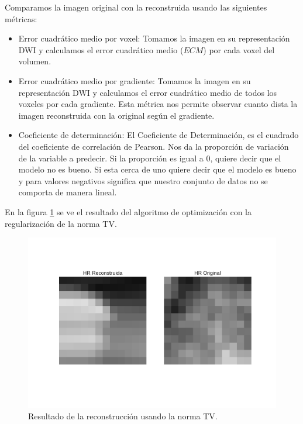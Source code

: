 \documentclass[a4paper,10pt]{article}%
\begin{document}
Comparamos la imagen original con la reconstruida usando las siguientes 
métricas:

\begin{itemize}
 \item Error cuadrático medio por voxel: Tomamos la imagen en su 
representación DWI y calculamos el error cuadrático medio ($ECM$) por cada voxel del 
volumen.
 \item Error cuadrático medio por gradiente: Tomamos la imagen en su 
representación DWI y calculamos el error cuadrático medio de todos los voxeles 
por cada gradiente. Esta métrica nos permite observar cuanto dista la imagen 
reconstruida con la original según el gradiente.
 \item Coeficiente de determinación: El Coeficiente de Determinación, es el cuadrado del 
coeficiente de correlación de Pearson. Nos da la proporción de variación de la variable a predecir. 
Si la proporción es igual a 0, quiere decir que el modelo no es bueno. Si esta cerca de uno 
quiere decir que el modelo es bueno y para valores negativos significa que nuestro conjunto de 
datos no se comporta de manera lineal.
\end{itemize}


En la figura \ref{resultado} se ve el resultado del algoritmo de optimización con la regularización de la norma TV.

\begin{figure}[H]
\includegraphics[scale=0.8]{Yhr_compare_s180129.pdf}
\caption{Resultado de la reconstrucción usando la norma TV. }
\label{resultado}
\end{figure}
\end{document}
